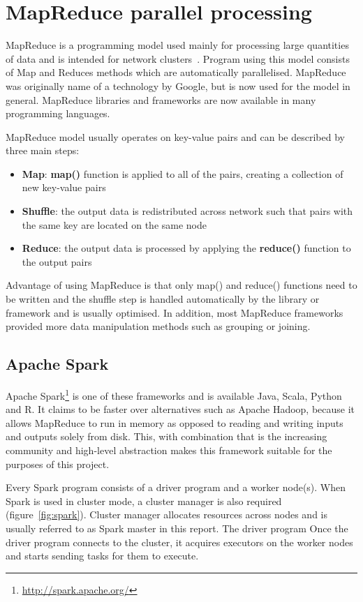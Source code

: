 \documentclass{l4proj}
\begin{document}
\section{MapReduce parallel processing}

MapReduce is a programming model used mainly for processing large quantities of data
and is intended for network clusters~\cite{map_reduce}. Program using this model consists of Map and Reduces
methods which are automatically parallelised. MapReduce was originally name of a technology by
Google, but is now used for the model in general. MapReduce libraries and frameworks are now 
available in many programming languages.

MapReduce model usually operates on key-value pairs and can be described by three main steps:

\begin{itemize}  
\item \textbf{Map}: \textbf{map()} function is applied to all of the pairs, creating a collection of new key-value pairs
\item \textbf{Shuffle}: the output data is redistributed across network such that pairs with the same key are located on the same node
\item \textbf{Reduce}: the output data is processed by applying the \textbf{reduce()} function to the output pairs
\end{itemize}

Advantage of using MapReduce is that only map() and reduce() functions need to be written and
the shuffle step is handled automatically by the library or framework and is usually optimised. 
In addition, most MapReduce frameworks provided more data manipulation methods such as grouping or 
joining.

\subsection{Apache Spark}

Apache Spark\footnote{\url{http://spark.apache.org/}} is one of these frameworks and is available Java, Scala, Python and R. It claims
to be faster over alternatives such as Apache Hadoop, because it allows MapReduce to run in
memory as opposed to reading and writing inputs and outputs solely from disk. This, with combination
that is the increasing community and high-level abstraction makes this framework suitable for the purposes
of this project.  

Every Spark program consists of a driver program and a worker node(s). When Spark is
used in cluster mode, a cluster manager is also required (figure~\ref{fig:spark}). Cluster manager allocates resources
across nodes and is usually referred to as Spark master in this report. The driver program
Once the driver program connects to the cluster, it acquires executors on the worker nodes and
starts sending tasks for them to execute.
\end{document}
